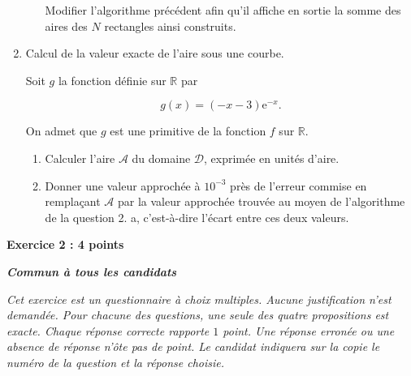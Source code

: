 \documentclass[10pt]{article}
\newcommand{\R}{\mathbb{R}}
\begin{document}
\begin{enumerate}
\begin{enumerate}
Modifier l'algorithme précédent afin qu'il affiche en sortie la somme des aires des $N$ rectangles ainsi construits.
	\end{enumerate}
\item Calcul de la valeur exacte de l'aire sous une courbe.

Soit $g$ la fonction définie sur $\R$ par 
  
\[g(x)=(- x - 3) \text{e}^{-x}.\]
  
On admet que $g$ est une primitive de la fonction $f$ sur $\mathbb{R}$.
	\begin{enumerate}
		\item Calculer l'aire $\mathscr A$ du domaine $\mathscr D$, exprimée en unités d'aire.
		\item Donner une valeur approchée à $10^{-3}$ près de l'erreur commise en remplaçant $\mathscr A$ par la valeur approchée trouvée au moyen de l'algorithme de la question 2. a, c'est-à-dire l'écart entre ces deux valeurs.
	\end{enumerate}
\end{enumerate}

\vspace{0,5cm}

\textbf{Exercice 2 : \hfill 4 points} 

\emph{\bfseries Commun à tous les candidats}

\medskip

\emph{Cet exercice est un questionnaire à choix multiples. Aucune justification n'est demandée. Pour chacune des questions, une seule des quatre propositions est exacte. Chaque réponse correcte rapporte $1$ point. Une réponse erronée ou une absence de réponse n'ôte pas de point. Le candidat indiquera sur la copie le numéro de la question et la réponse choisie.}

\medskip
\end{document}
